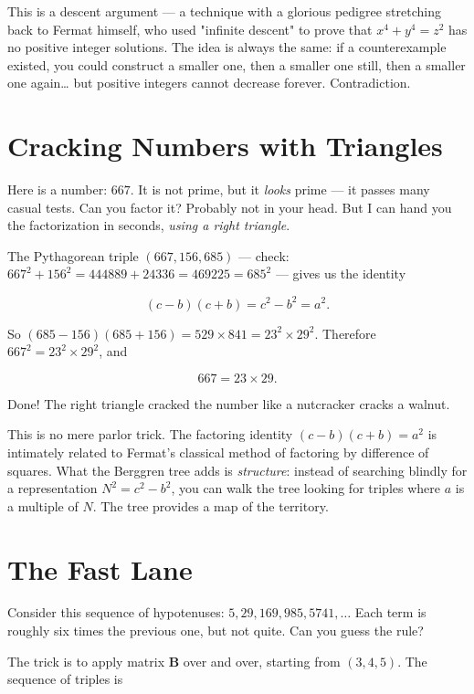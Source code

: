 \documentclass[11pt,twoside,openright]{book}
\theoremstyle{definition}
\theoremstyle{remark}
\begin{document}
This is a descent argument --- a technique with a glorious pedigree stretching back to Fermat himself, who used "infinite descent" to prove that $x^4 + y^4 = z^2$ has no positive integer solutions. The idea is always the same: if a counterexample existed, you could construct a smaller one, then a smaller one still, then a smaller one again\ldots{} but positive integers cannot decrease forever. Contradiction.


\section{Cracking Numbers with Triangles}

Here is a number: $667$. It is not prime, but it \textit{looks} prime --- it passes many casual tests. Can you factor it? Probably not in your head. But I can hand you the factorization in seconds, \textit{using a right triangle}.

The Pythagorean triple $(667, 156, 685)$ --- check: $667^2 + 156^2 = 444889 + 24336 = 469225 = 685^2$ --- gives us the identity

\[(c - b)(c + b) = c^2 - b^2 = a^2.\]

So $(685 - 156)(685 + 156) = 529 \times 841 = 23^2 \times 29^2$. Therefore $667^2 = 23^2 \times 29^2$, and

\[667 = 23 \times 29.\]

Done! The right triangle cracked the number like a nutcracker cracks a walnut.


This is no mere parlor trick. The factoring identity $(c-b)(c+b) = a^2$ is intimately related to Fermat's classical method of factoring by difference of squares. What the Berggren tree adds is \textit{structure}: instead of searching blindly for a representation $N^2 = c^2 - b^2$, you can walk the tree looking for triples where $a$ is a multiple of $N$. The tree provides a map of the territory.



\section{The Fast Lane}

Consider this sequence of hypotenuses: $5, 29, 169, 985, 5741, \ldots$ Each term is roughly six times the previous one, but not quite. Can you guess the rule?

The trick is to apply matrix $\mathbf{B}$ over and over, starting from $(3, 4, 5)$. The sequence of triples is
\end{document}
